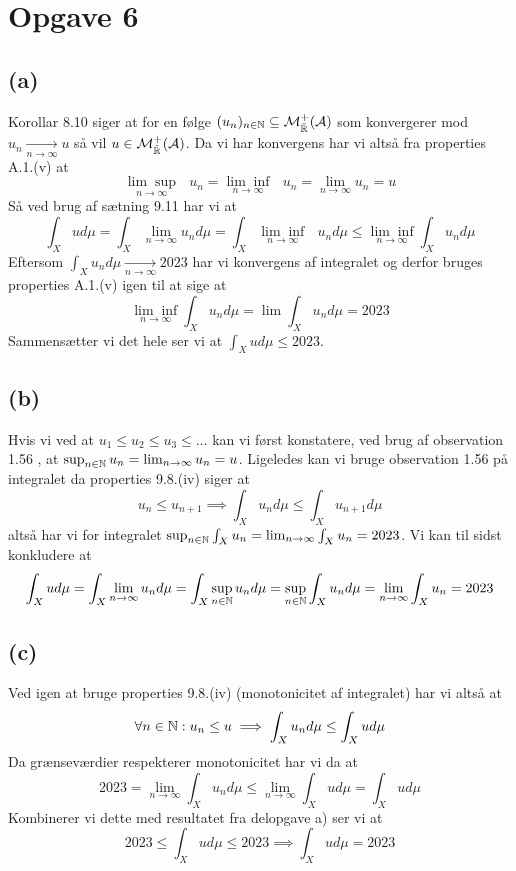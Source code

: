 \documentclass{article}
\begin{document}
\section*{Opgave 6}

\subsection*{(a)}
Korollar 8.10 siger at for en følge 
$(u_n)_{n \in \mathbb{N}} \subseteq \mathcal{M}_{\bar{\mathbb{R}}}^{+}(\mathcal{A})$ som konvergerer mod 
$u_n \underset{n \to \infty}{\longrightarrow} u$ så vil $u \in \mathcal{M}_{\bar{\mathbb{R}}}^{+}(\mathcal{A})$.
Da vi har konvergens har vi altså fra properties A.1.(v) \cite{lim} at 
\[
    \underset{n \to \infty}{\lim \sup} \text{ } u_n =
    \underset{n \to \infty}{\lim \inf} \text{ } u_n =
    \lim_{n \to \infty} u_n  
    = u
\] 
Så ved brug af sætning 9.11 \cite{lim} har vi at
\[
    \int_{X} u d \mu =
    \int_{X} \lim_{n \to \infty} u_n d \mu =
    \int_{X} \underset{n \to \infty}{\lim \inf} \text{ } u_n d \mu \le
    \underset{n \to \infty}{\lim \inf} \int_{X} u_n d \mu
\]
Eftersom $\int_{X} u_n d \mu \underset{n \to \infty}{\longrightarrow} 2023$ har vi konvergens
af integralet og derfor bruges properties A.1.(v) \cite{lim} igen til at sige at
\[
    \underset{n \to \infty}{\lim \inf} \int_{X} u_n d \mu =
    \lim \int_{X} u_n d \mu = 2023
\]
Sammensætter vi det hele ser vi at $\int_{X} u d \mu \le 2023$.

\subsection*{(b)}
Hvis vi ved at $u_1 \le u_2 \le u_3 \le \dots$ kan vi først konstatere, ved brug af observation 1.56 \cite{an1}, at 
$\sup_{n \in \mathbb{N}} u_n = \lim_{n \to \infty} u_n = u$.
Ligeledes kan vi bruge observation 1.56 \cite{an1} på integralet da properties 9.8.(iv) siger at
\[
    u_n \le u_{n+1} \implies \int_{X} u_n d \mu \le \int_{X} u_{n+1} d \mu
\]
altså  har vi for integralet $\sup_{n \in \mathbb{N}} \int_{X} u_n = \lim_{n \to \infty} \int_{X} u_n = 2023$.
Vi kan til sidst konkludere at
\[
\int_{X} u d \mu = 
\int_{X} \lim_{n \to \infty} u_n d \mu = 
\int_{X} \sup_{n \in \mathbb{N}} u_n d \mu = 
\sup_{n \in \mathbb{N}} \int_{X} u_n d \mu =
\lim_{n \to \infty} \int_{X} u_n  = 2023
\]
\subsection*{(c)}
Ved igen at bruge properties 9.8.(iv) (monotonicitet af integralet) \cite{lim} har vi altså
at
\[
\forall n \in \mathbb{N} : u_n \le u \implies \int_{X} u_n d \mu \le \int_{X} u d \mu 
\]
Da grænseværdier respekterer monotonicitet har vi da at
\[
    2023 = \lim_{n \to \infty} \int_{X} u_n d \mu \le
    \lim_{n \to \infty} \int_{X} u d \mu = 
    \int_{X} u d \mu
\]
Kombinerer vi dette med resultatet fra delopgave a) ser vi at
\[
    2023 \le \int_{X} u d \mu \le 2023 \implies \int_{X} u d \mu = 2023
\]
\end{document}
